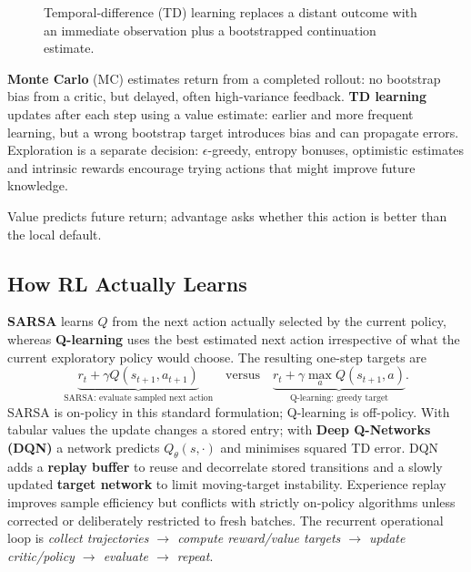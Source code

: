 \begin{figure}[!htbp]\centering
{}
\caption{Temporal-difference (TD) learning replaces a distant outcome with an immediate observation plus a bootstrapped continuation estimate.}
\end{figure}
\textbf{Monte Carlo} (MC) estimates return from a completed rollout: no bootstrap bias from a critic, but delayed, often high-variance feedback.
\textbf{TD learning} updates after each step using a value estimate: earlier and more frequent learning, but a wrong bootstrap target introduces bias and can propagate errors.
Exploration is a separate decision: $\epsilon$-greedy, entropy bonuses, optimistic estimates and intrinsic rewards encourage trying actions that might improve future knowledge.
\begin{calloutintuition}
Value predicts future return; advantage asks whether this action is better than the local default.
\end{calloutintuition}

\subsection{How RL Actually Learns}\label{sec:rl-learning}
\textbf{SARSA} learns $Q$ from the next action actually selected by the current policy, whereas \textbf{Q-learning} uses the best estimated next action irrespective of what the current exploratory policy would choose.
The resulting one-step targets are
\[
\underbrace{r_t+\gamma Q(s_{t+1},a_{t+1})}_{\text{SARSA: evaluate sampled next action}}
\quad\text{versus}\quad
\underbrace{r_t+\gamma\max_a Q(s_{t+1},a)}_{\text{Q-learning: greedy target}}.
\]
SARSA is on-policy in this standard formulation; Q-learning is off-policy.
With tabular values the update changes a stored entry; with \textbf{Deep Q-Networks (DQN)} a network predicts $Q_{\theta}(s,\cdot)$ and minimises squared TD error.
DQN adds a \textbf{replay buffer} to reuse and decorrelate stored transitions and a slowly updated \textbf{target network} to limit moving-target instability.
Experience replay improves sample efficiency but conflicts with strictly on-policy algorithms unless corrected or deliberately restricted to fresh batches.
The recurrent operational loop is \emph{collect trajectories $\rightarrow$ compute reward/value targets $\rightarrow$ update critic/policy $\rightarrow$ evaluate $\rightarrow$ repeat}.

